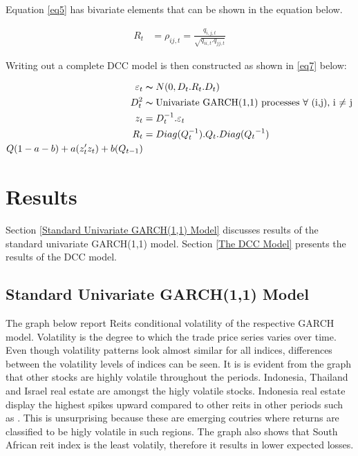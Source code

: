 \documentclass[11pt,preprint, authoryear]{elsarticle}
\numberwithin{equation}{section}
\numberwithin{figure}{section}
\numberwithin{table}{section}
\begin{document}
Equation \ref{eq5} has bivariate elements that can be shown in the
equation below.

\begin{align} \label{eq6}
R_t &= \rho_{ij,t} = \frac{q_{i,j,t}}{\sqrt{q_{ii,t}.q_{jj,t}}} 
\end{align}

Writing out a complete DCC model is then constructed as shown in
\ref{eq7} below:

\begin{align} \label{eq7}
\varepsilon_t &\thicksim  N(0,D_t.R_t.D_t) \notag \\
D_t^2 &\thicksim \text{Univariate GARCH(1,1) processes $\forall$ (i,j), i $\ne$ j} \notag \\
z_t&=D_t^{-1}.\varepsilon_t \notag \\
R_t &= Diag(Q_t^{-1}).Q_t.Diag({Q_t}^{-1}) \notag \\
{Q}(1-a-b)+a(z_t'z_t)+b(Q_{t-1}) \notag \\
\end{align}

\hypertarget{results}{%
\section{\texorpdfstring{Results
\label{Results}}{Results }}\label{results}}

Section \ref{Standard Univariate GARCH(1,1) Model} discusses results of
the standard univariate GARCH(1,1) model. Section \ref{The DCC Model}
presents the results of the DCC model.

\hypertarget{standard-univariate-garch11-model}{%
\subsection{\texorpdfstring{Standard Univariate GARCH(1,1) Model
\label{Standard Univariate GARCH(1,1) Model}}{Standard Univariate GARCH(1,1) Model }}\label{standard-univariate-garch11-model}}

The graph below report Reits conditional volatility of the respective
GARCH model. Volatility is the degree to which the trade price series
varies over time. Even though volatility patterns look almost similar
for all indices, differences between the volatility levels of indices
can be seen. It is is evident from the graph that other stocks are
highly volatile throughout the periods. Indonesia, Thailand and Israel
real estate are amongst the higly volatile stocks. Indonesia real estate
display the highest spikes upward compared to other reits in other
periods such as . This is unsurprising because these are emerging
coutries where returns are classified to be higly volatile in such
regions. The graph also shows that South African reit index is the least
volatily, therefore it results in lower expected losses.
\end{document}
